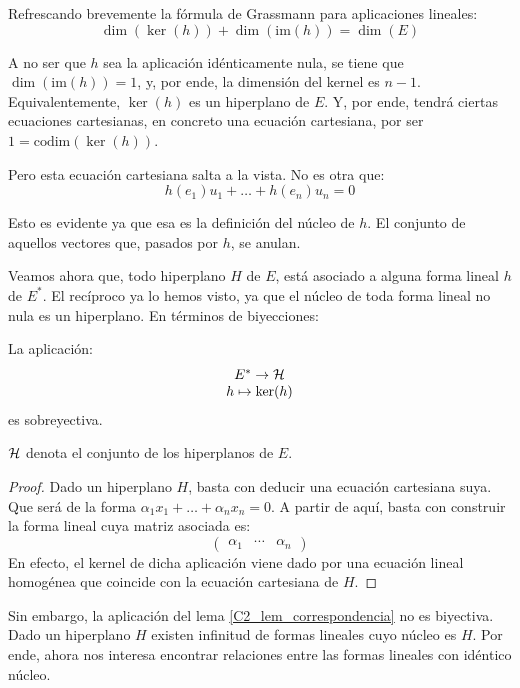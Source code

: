 Refrescando brevemente la fórmula de Grassmann para aplicaciones lineales:
\[\dim(\ker(h))+\dim(\mathrm{im}(h))=\dim(E)\]

A no ser que $h$ sea la aplicación idénticamente nula, se tiene que $\dim(\mathrm{im}(h))=1$, y, por ende, la dimensión del kernel es $n-1$. Equivalentemente, $\ker(h)$ es un hiperplano de $E$. Y, por ende, tendrá ciertas ecuaciones cartesianas, en concreto una ecuación cartesiana, por ser $1=\mathrm{codim}(\ker(h))$.

Pero esta ecuación cartesiana salta a la vista. No es otra que:
\[h(e_1)u_1+\dots+h(e_n)u_n=0\]

Esto es evidente ya que esa es la definición del núcleo de $h$. El conjunto de aquellos vectores que, pasados por $h$, se anulan.

Veamos ahora que, todo hiperplano $H$ de $E$, está asociado a alguna forma lineal $h$ de $E^*$. El recíproco ya lo hemos visto, ya que el núcleo de toda forma lineal no nula es un hiperplano. En términos de biyecciones:
\begin{lem}
	\label{C2_lem_correspondencia}
	La aplicación:
	\[\begin{array}{c}
	E^*\to\mathcal{H}\\
	h\mapsto \ker(h)
	\end{array}\]
	es sobreyectiva.
	
	$\mathcal{H}$ denota el conjunto de los hiperplanos de $E$.
\end{lem}
\begin{proof}
	Dado un hiperplano $H$, basta con deducir una ecuación cartesiana suya. Que será de la forma $\alpha_1x_1+\dots+\alpha_nx_n=0$. A partir de aquí, basta con construir la forma lineal cuya matriz asociada es:
	\[\begin{pmatrix}
	\alpha_1 & \cdots & \alpha_n
	\end{pmatrix}\]
	En efecto, el kernel de dicha aplicación viene dado por una ecuación lineal homogénea que coincide con la ecuación cartesiana de $H$.
\end{proof}

Sin embargo, la aplicación del lema \ref{C2_lem_correspondencia} no es biyectiva. Dado un hiperplano $H$ existen infinitud de formas lineales cuyo núcleo es $H$. Por ende, ahora nos interesa encontrar relaciones entre las formas lineales con idéntico núcleo.

